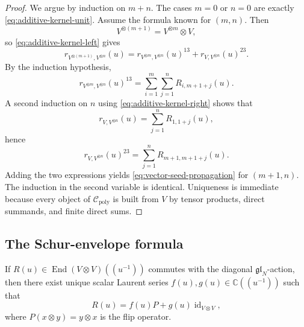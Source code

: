 \begin{proof}
We argue by induction on $m+n$.  The cases $m=0$ or $n=0$ are exactly
\eqref{eq:additive-kernel-unit}.  Assume the formula known for
$(m,n)$.  Then
\begin{equation}
V^{\otimes(m+1)}=V^{\otimes m}\otimes V,
\end{equation}
so \eqref{eq:additive-kernel-left} gives
\begin{equation}
r_{V^{\otimes(m+1)},V^{\otimes n}}(u)
=
r_{V^{\otimes m},V^{\otimes n}}(u)^{13}
+
r_{V,V^{\otimes n}}(u)^{23}.
\end{equation}
By the induction hypothesis,
\begin{equation}
r_{V^{\otimes m},V^{\otimes n}}(u)^{13}
=
\sum_{i=1}^{m}\sum_{j=1}^{n}R_{i,m+1+j}(u).
\end{equation}
A second induction on $n$ using \eqref{eq:additive-kernel-right} shows
that
\begin{equation}
r_{V,V^{\otimes n}}(u)=\sum_{j=1}^n R_{1,1+j}(u),
\end{equation}
hence
\begin{equation}
r_{V,V^{\otimes n}}(u)^{23}
=
\sum_{j=1}^n R_{m+1,m+1+j}(u).
\end{equation}
Adding the two expressions yields \eqref{eq:vector-seed-propagation} for
$(m+1,n)$.  The induction in the second variable is identical.  Uniqueness
is immediate because every object of $\mathcal C_{\mathrm{poly}}$ is built
from $V$ by tensor products, direct summands, and finite direct sums.
\end{proof}

\subsection{The Schur-envelope formula}

\begin{lemma}
\ClaimStatusProvedHere
\label{lem:equivariant-normal-form}
If $R(u)\in \operatorname{End}(V\otimes V)((u^{-1}))$ commutes with the
diagonal $\mathfrak{gl}_N$-action, then there exist unique scalar Laurent
series $f(u),g(u)\in \mathbb C((u^{-1}))$ such that
\begin{equation}
R(u)=f(u)P+g(u)\operatorname{id}_{V\otimes V},
\end{equation}
where $P(x\otimes y)=y\otimes x$ is the flip operator.
\end{lemma}

